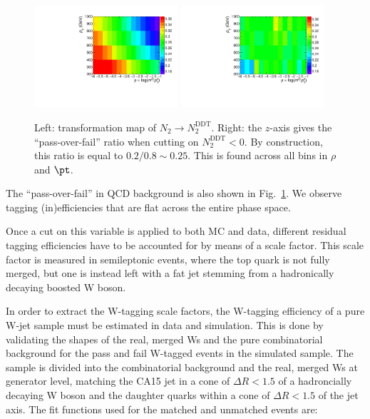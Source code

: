 \begin{figure}
  \centering
  \includegraphics[width=0.475\textwidth]{figures/higgstagging/n2ddt/h2ddt.pdf}
  \includegraphics[width=0.475\textwidth]{figures/higgstagging/n2ddt/h2_rhoVpt_pafa.pdf}\\
  \caption{Left: transformation map of $N_2\rightarrow N_2^{\text{DDT}}$. Right: the $z$-axis gives the ``pass-over-fail'' ratio when cutting on $N_2^\text{DDT}<0$. By construction, this ratio is equal to $0.2/0.8\sim0.25$. This is found across all bins in $\rho$ and $\pt$.}
  \label{fig:transmap_20percent}
\end{figure}

The ``pass-over-fail'' in QCD background is also shown in Fig.~\ref{fig:transmap_20percent}. We observe tagging (in)efficiencies that are flat across the entire phase space. 


Once a cut on this variable is applied to both MC and data, different residual tagging efficiencies have to be accounted for by means of a scale factor. This scale factor is measured in semileptonic \ttbar events, where the top quark is not fully merged, but one is instead left with a fat jet stemming from a hadronically decaying boosted W boson.



In order to extract the W-tagging scale factors, the W-tagging efficiency of a pure W-jet sample must be estimated in data and simulation. This is done by validating the shapes of the real, merged Ws and the pure combinatorial background for the pass and fail W-tagged events in the \ttbar simulated sample. The \ttbar sample is divided into the combinatorial background and the real, merged Ws at generator level, matching the CA15 jet in a cone of $\Delta R <1.5$ of a hadroncially decaying W boson and the daughter quarks within a cone of $\Delta R <1.5$ of the jet axis. The fit functions used for the matched and unmatched events are:

